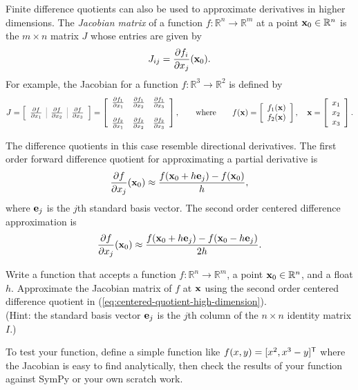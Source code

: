Finite difference quotients can also be used to approximate derivatives in higher dimensions.
The \emph{Jacobian matrix} of a function $f:\mathbb{R}^n \rightarrow \mathbb{R}^m$ at a point $\mathbf{x}_0 \in \mathbb{R}^n$ is the $m \times n$ matrix $J$ whose entries are given by
\begin{equation*}
J_{ij} = \frac{\partial f_i}{\partial x_j}(\mathbf{x}_0).
\end{equation*}
For example, the Jacobian for a function $f:\mathbb{R}^3 \rightarrow \mathbb{R}^2$ is defined by
\[
J = \left[\begin{array}{c|c|c}
\arrayrulecolor{gray}
\frac{\partial f}{\partial x_1}&\frac{\partial f}{\partial x_2}&\frac{\partial f}{\partial x_3}
\end{array}\right]
=
\left[\begin{array}{ccc}
\frac{\partial f_1}{\partial x_1}&\frac{\partial f_1}{\partial x_2}&\frac{\partial f_1}{\partial x_3}
\\ \\
\frac{\partial f_2}{\partial x_1}&\frac{\partial f_2}{\partial x_2}&\frac{\partial f_2}{\partial x_3}
\end{array}\right],
\qquad
\text{where}
\qquad
f(\x) =
\left[\begin{array}{c}
f_1(\x) \\ f_2(\x)
\end{array}\right],
\quad
\x = \left[\begin{array}{c}
x_1 \\ x_2 \\ x_3
\end{array}\right].
\]

The difference quotients in this case resemble directional derivatives.
The first order forward difference quotient for approximating a partial derivative is
\[
\frac{\partial f}{\partial x_j}(\mathbf{x}_0) \approx \frac{f(\mathbf{x}_0 + h\mathbf{e}_j) - f(\mathbf{x}_0)}{h},
\]
where $\mathbf{e}_j$ is the $j$th standard basis vector.
The second order centered difference approximation is
\begin{equation}
\frac{\partial f}{\partial x_j}(\mathbf{x}_0) \approx \frac{f(\mathbf{x}_0 + h\mathbf{e}_j) - f(\mathbf{x}_0 - h\mathbf{e}_j)}{2h}.
\label{eq:centered-quotient-high-dimension}
\end{equation}

\begin{problem}
Write a function that accepts a function $f:\mathbb{R}^n\rightarrow\mathbb{R}^m$, a point $\mathbf{x}_0 \in \mathbb{R}^n$, and a float $h$.
Approximate the Jacobian matrix of $f$ at $\mathbf{x}$ using the second order centered difference quotient in (\ref{eq:centered-quotient-high-dimension}).
\\(Hint: the standard basis vector $\mathbf{e}_j$ is the $j$th column of the $n\times n$ identity matrix $I$.)

To test your function, define a simple function like $f(x,y) = [x^2, x^3 - y]^{\mathsf T}$ where the Jacobian is easy to find analytically, then check the results of your function against SymPy or your own scratch work.
\label{prob:jac_center}
\end{problem}

